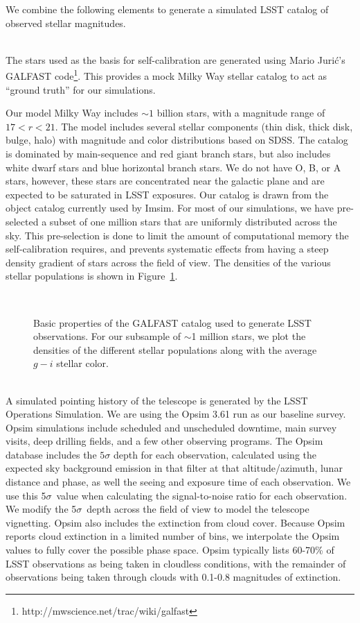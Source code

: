 \documentclass[12pt,preprint]{aastex}
\begin{document}
We combine the following elements to generate a simulated LSST catalog of observed stellar magnitudes.

\\
The stars used as the basis for self-calibration are generated using Mario Juri\'{c}'s GALFAST code\footnote{ http://mwscience.net/trac/wiki/galfast}.  This provides a mock Milky Way stellar catalog to act as ``ground truth'' for our simulations.  

Our model Milky Way includes $\sim1$ billion stars, with a magnitude range of $17 < r < 21$.  The model includes several stellar components (thin disk, thick disk, bulge, halo) with magnitude and color distributions based on SDSS. The catalog is dominated by main-sequence and red giant branch stars, but also includes white dwarf stars and blue horizontal branch stars.  We do not have O, B, or A stars, however, these stars are concentrated near the galactic plane and are expected to be saturated in LSST exposures.  Our catalog is drawn from the object catalog currently used by Imsim.  For most of our simulations, we have pre-selected a subset of one million stars that are uniformly distributed across the sky.  This pre-selection is done to limit the amount of computational memory the self-calibration requires, and prevents systematic effects from having a steep density gradient of stars across the field of view.  The densities of the various stellar populations is shown in Figure~\ref{fig:gfpop}.


\begin{figure}
\\
\caption{Basic properties of the GALFAST catalog used to generate LSST observations.  For our subsample of $\sim$1 million stars, we plot the densities of the different stellar populations along with the average $g-i$ stellar color.\label{fig:gfpop}}
\end{figure}


\\
A simulated pointing history of the telescope is generated by the LSST Operations Simulation. We are using the Opsim 3.61 run as our baseline survey.  Opsim simulations include scheduled and unscheduled downtime, main survey visits, deep drilling fields, and a few other observing programs. The Opsim database includes the $5\sigma$ depth for each observation, calculated using the expected sky background emission in that filter at that altitude/azimuth, lunar distance and phase, as well the seeing and exposure time of each observation.  We use this 5$\sigma$\ value when calculating the signal-to-noise ratio for each observation.  We modify the 5$\sigma$\ depth across the field of view to model the telescope vignetting.  Opsim also includes the extinction from cloud cover.  Because Opsim reports cloud extinction in a limited number of bins, we interpolate the Opsim values to fully cover the possible phase space.  Opsim typically lists 60-70\% of LSST observations as being taken in cloudless conditions, with the remainder of observations being taken through clouds with 0.1-0.8 magnitudes of extinction.  
\end{document}
